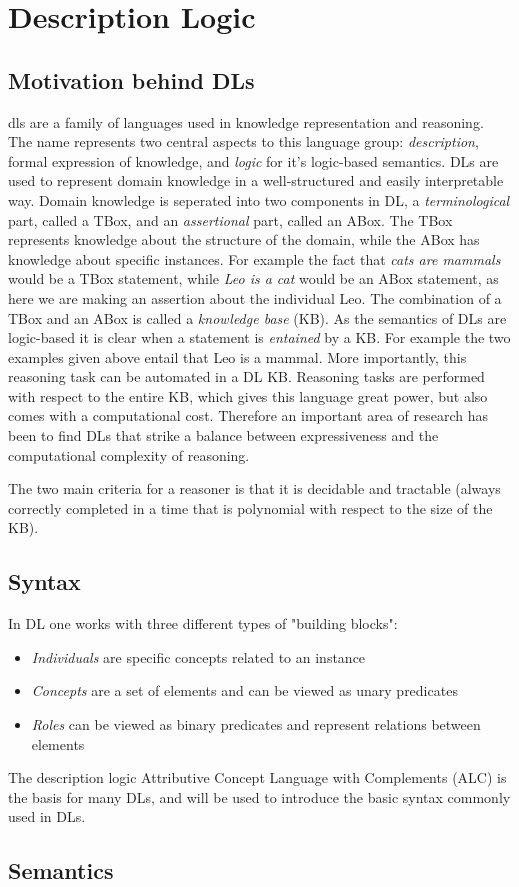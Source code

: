 \chapter{Description Logic}


\section{Motivation behind DLs}
\gls{dls} are a family of languages used in knowledge representation and reasoning. The name represents two central aspects to this language group: \emph{description}, formal expression of knowledge, and  \emph{logic} for it's logic-based semantics. DLs are used to represent domain knowledge in a well-structured and easily interpretable way. Domain knowledge is seperated into two components in DL, a \emph{terminological} part, called a TBox, and an \emph{assertional} part, called an ABox. The TBox represents knowledge about the structure of the domain, while the ABox has knowledge about specific instances. For example the fact that \emph{cats are  mammals} would be a TBox statement, while \emph{Leo is a cat} would be an ABox statement, as here we are making an assertion about the individual Leo. The combination of a TBox and an ABox is called a \emph{knowledge base} (KB).
As the semantics of DLs are logic-based it is clear when a statement is \emph{entained} by a KB. For example the two examples given above entail that Leo is a mammal. More importantly, this reasoning task can be automated in a DL KB. Reasoning tasks are performed with respect to the entire KB, which gives this language great power, but also comes with a computational cost. Therefore an important area of research has been to find DLs that strike a balance between expressiveness and the computational complexity of reasoning.


The two main criteria for a reasoner is that it is decidable and tractable (always correctly completed in a time that is polynomial with respect to the size of the KB).

\section{Syntax}
In DL one works with three different types of "building blocks":
\begin{itemize}
        \item \textit{Individuals} are specific concepts related to an instance
    \item \textit{Concepts} are a set of elements and can be viewed as unary predicates
    \item \textit{Roles} can be viewed as binary predicates and represent relations between elements
\end{itemize}

The description logic Attributive Concept Language with Complements (ALC) is the basis for many DLs, and will be used to introduce the basic syntax commonly used in DLs.



\section{Semantics}

